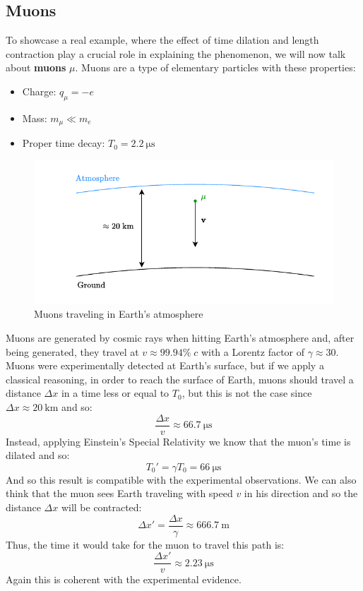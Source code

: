\subsection{Muons}
To showcase a real example, where the effect of time dilation and length contraction play a crucial role in explaining the phenomenon, we will now talk about \textbf{muons} $\mu$. Muons are a type of elementary particles with these properties:
\begin{itemize}
  \item Charge: $q_{\mu} = -e$
  \item Mass: $m_{\mu} \ll m_{e}$
  \item Proper time decay: $T_0 = \qty{2.2}{\micro\second}$
\end{itemize}
\begin{figure}[H]
  \centering
  \includegraphics[width=0.8\linewidth]{res/svg/muons_bad.drawio}
  \caption{Muons traveling in Earth's atmosphere}
\end{figure}
Muons are generated by cosmic rays when hitting Earth's atmosphere and, after being generated, they travel at $v \approx 99.94\%\;c$ with a Lorentz factor of $\gamma \approx 30$. Muons were experimentally detected at Earth's surface, but if we apply a classical reasoning, in order to reach the surface of Earth, muons should travel a distance $\Delta x$ in a time less or equal to $T_0$, but this is not the case since $\Delta x \approx \qty{20}{\kilo\meter}$ and so:
\begin{equation}
  \dfrac{\Delta x}{v} \approx \qty{66.7}{\micro\second}
\end{equation}
Instead, applying Einstein's Special Relativity we know that the muon's time is dilated and so:
\begin{equation}
  T_0' = \gamma T_0 = \qty{66}{\micro\second}
\end{equation}
And so this result is compatible with the experimental observations. We can also think that the muon sees Earth traveling with speed $v$ in his direction and so the distance $\Delta x$ will be contracted:
\begin{equation}
  \Delta x' = \dfrac{\Delta x}{\gamma} \approx \qty{666.7}{\meter}
\end{equation}
Thus, the time it would take for the muon to travel this path is:
\begin{equation}
  \dfrac{\Delta x'}{v} \approx \qty{2.23}{\micro\second}
\end{equation}
Again this is coherent with the experimental evidence.
